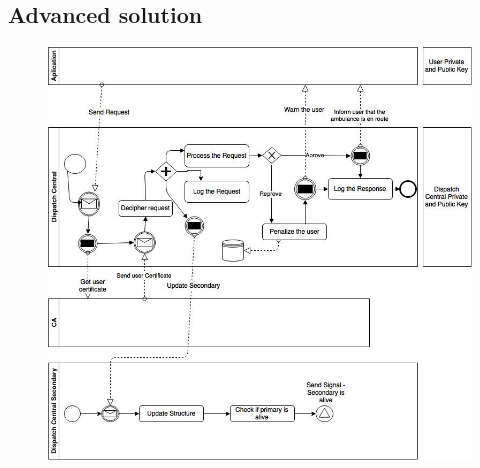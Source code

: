 \documentclass[a4paper,titlepage,11pt]{article}
\begin{document}
\newpage

\subsection{Advanced solution}
\begin{figure}[h]
    \centering
    \includegraphics[scale=0.50]{img/advanced-solution.png}
\end{figure}
\end{document}
